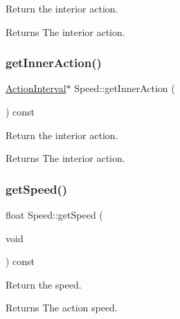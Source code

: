 Return the interior action.

\begin{DoxyReturn}{Returns}
The interior action. 
\end{DoxyReturn}
\mbox{\label{classSpeed_a1b48ca1bbd76431c0ebe2d59f0075331}} 
\subsubsection{\texorpdfstring{get\+Inner\+Action()}{getInnerAction()}\hspace{0.1cm}{\footnotesize\ttfamily [2/2]}}
{\footnotesize\ttfamily \hyperlink{classActionInterval}{Action\+Interval}$\ast$ Speed\+::get\+Inner\+Action (\begin{DoxyParamCaption}{ }\end{DoxyParamCaption}) const\hspace{0.3cm}{\ttfamily [inline]}}

Return the interior action.

\begin{DoxyReturn}{Returns}
The interior action. 
\end{DoxyReturn}
\mbox{\label{classSpeed_a86aa1c63949b9bf1256b02915f8d6483}} 
\subsubsection{\texorpdfstring{get\+Speed()}{getSpeed()}\hspace{0.1cm}{\footnotesize\ttfamily [1/2]}}
{\footnotesize\ttfamily float Speed\+::get\+Speed (\begin{DoxyParamCaption}\item[{void}]{ }\end{DoxyParamCaption}) const\hspace{0.3cm}{\ttfamily [inline]}}

Return the speed.

\begin{DoxyReturn}{Returns}
The action speed. 
\end{DoxyReturn}
\mbox{\label{classSpeed_a865cd7267938f4847c355f9e37c058e8}} 
